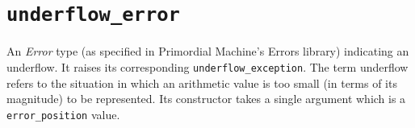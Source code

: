 \documentclass[oneside]{book}
\begin{document}
\section{\texttt{underflow\_error}}
An \textit{Error} type (as specified in Primordial Machine's Errors library) indicating an underflow.
It raises its corresponding \texttt{underflow\_exception}.
The term underflow refers to the situation in which an arithmetic value is too small (in terms of
its magnitude) to be represented. Its constructor takes a single argument which
is a \texttt{error\_position} value.
\end{document}
